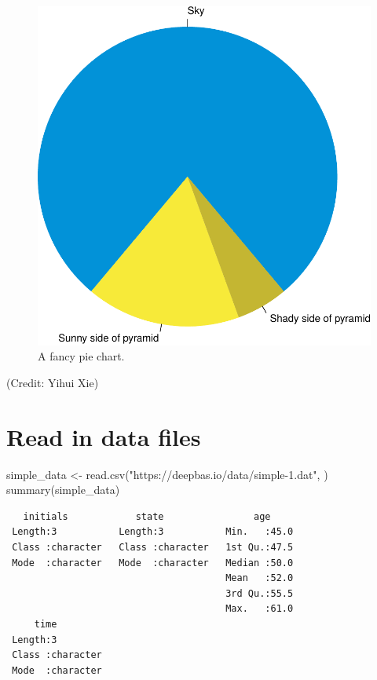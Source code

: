 \documentclass[
]{book}
\newenvironment{Shaded}{\begin{snugshade}}{\end{snugshade}}
\newcommand{\FunctionTok}[1]{\textcolor[rgb]{0.00,0.00,0.00}{#1}}
\newcommand{\NormalTok}[1]{#1}
\newcommand{\OtherTok}[1]{\textcolor[rgb]{0.56,0.35,0.01}{#1}}
\newcommand{\StringTok}[1]{\textcolor[rgb]{0.31,0.60,0.02}{#1}}
\begin{document}
\begin{figure}
\includegraphics[width=1\linewidth]{Rmarkdown_files/figure-latex/pie-1} \caption{A fancy pie chart.}\label{fig:pie}
\end{figure}

(Credit: Yihui Xie)

\hypertarget{read-in-data-files}{%
\section{Read in data files}\label{read-in-data-files}}

\begin{Shaded}
\begin{Highlighting}[]
\NormalTok{simple\_data }\OtherTok{\textless{}{-}} \FunctionTok{read.csv}\NormalTok{(}\StringTok{"https://deepbas.io/data/simple{-}1.dat"}\NormalTok{, )}
\FunctionTok{summary}\NormalTok{(simple\_data) }
\end{Highlighting}
\end{Shaded}

\begin{verbatim}
   initials            state                age      
 Length:3           Length:3           Min.   :45.0  
 Class :character   Class :character   1st Qu.:47.5  
 Mode  :character   Mode  :character   Median :50.0  
                                       Mean   :52.0  
                                       3rd Qu.:55.5  
                                       Max.   :61.0  
     time          
 Length:3          
 Class :character  
 Mode  :character  
                   
                   
                   
\end{verbatim}
\end{document}
